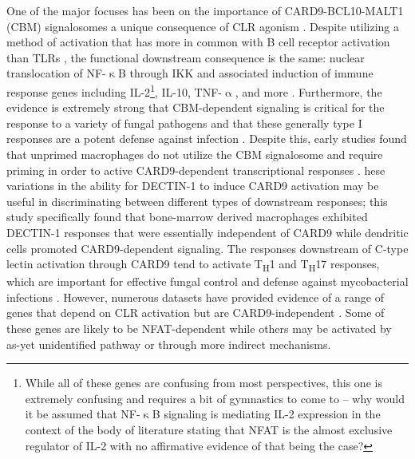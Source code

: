 One of the major focuses has been on the importance of CARD9\hyp{}BCL10\hyp{}MALT1 (CBM) signalosomes a unique consequence of CLR agonism \citep{Drummond2011a, Drummond2016, Drummond2018, Marakalala2010, Marakalala2017}. Despite utilizing a method of activation that has more in common with B cell receptor activation than TLRs \citep{Monroe2006}, the functional downstream consequence is the same: nuclear translocation of NF\hyp{}$\upkappa$B through IKK and associated induction of immune response genes including IL\hyp{}2\footnote{While all of these genes are confusing from most perspectives, this one is extremely confusing and requires a bit of gymnastics to come to -- why would it be assumed that NF\hyp{}$\upkappa$B signaling is mediating IL\hyp{}2 expression in the context of the body of literature stating that NFAT is the almost exclusive regulator of IL\hyp{}2 with no affirmative evidence of that being the case?}, IL\hyp{}10, TNF\hyp{}$\upalpha$, and more \citep{Sancho2012}. Furthermore, the evidence is extremely strong that CBM\hyp{}dependent signaling is critical for the response to a variety of fungal pathogens and that these generally type I responses are a potent defense against infection \citep{Drummond2018, Hardison2012, Willment2008}. Despite this, early studies found that unprimed macrophages do not utilize the CBM signalosome and require priming in order to active CARD9\hyp{}dependent transcriptional responses \citep{Goodridge2009}. hese variations in the ability for DECTIN\hyp{}1 to induce CARD9 activation may be useful in discriminating between different types of downstream responses; this study specifically found that bone\hyp{}marrow derived macrophages exhibited DECTIN\hyp{}1 responses that were essentially independent of CARD9 while dendritic cells promoted CARD9\hyp{}dependent signaling. The responses downstream of C\hyp{}type lectin activation through CARD9 tend to activate T\textsubscript{H}1 and T\textsubscript{H}17 responses, which are important for effective fungal control and defense against mycobacterial infections \citep{Drummond2011a, Lyadova2015, Zanoni2005, Zenaro2009}. However, numerous datasets have provided evidence of a range of genes that depend on CLR activation but are CARD9\hyp{}independent \citep{Deerhake2021}. Some of these genes are likely to be NFAT\hyp{}dependent while others may be activated by as\hyp{}yet unidentified pathway or through more indirect mechanisms.

